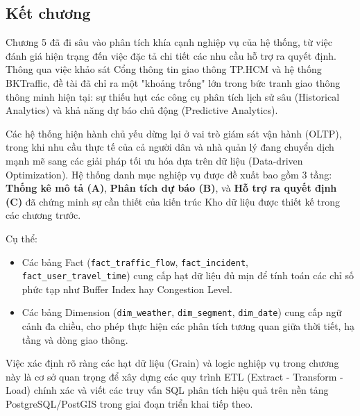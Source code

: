 \subsection{Kết chương}

Chương 5 đã đi sâu vào phân tích khía cạnh nghiệp vụ của hệ thống, từ việc đánh giá hiện trạng đến việc đặc tả chi tiết các nhu cầu hỗ trợ ra quyết định. Thông qua việc khảo sát Cổng thông tin giao thông TP.HCM và hệ thống BKTraffic, đề tài đã chỉ ra một "khoảng trống" lớn trong bức tranh giao thông thông minh hiện tại: sự thiếu hụt các công cụ phân tích lịch sử sâu (Historical Analytics) và khả năng dự báo chủ động (Predictive Analytics).

Các hệ thống hiện hành chủ yếu dừng lại ở vai trò giám sát vận hành (OLTP), trong khi nhu cầu thực tế của cả người dân và nhà quản lý đang chuyển dịch mạnh mẽ sang các giải pháp tối ưu hóa dựa trên dữ liệu (Data-driven Optimization). Hệ thống danh mục nghiệp vụ được đề xuất bao gồm 3 tầng: \textbf{Thống kê mô tả (A)}, \textbf{Phân tích dự báo (B)}, và \textbf{Hỗ trợ ra quyết định (C)} đã chứng minh sự cần thiết của kiến trúc Kho dữ liệu được thiết kế trong các chương trước.

Cụ thể:
\begin{itemize}
    \item Các bảng Fact (\texttt{fact\_traffic\_flow}, \texttt{fact\_incident}, \texttt{fact\_user\_travel\_time}) cung cấp hạt dữ liệu đủ mịn để tính toán các chỉ số phức tạp như Buffer Index hay Congestion Level.
    \item Các bảng Dimension (\texttt{dim\_weather}, \texttt{dim\_segment}, \texttt{dim\_date}) cung cấp ngữ cảnh đa chiều, cho phép thực hiện các phân tích tương quan giữa thời tiết, hạ tầng và dòng giao thông.
\end{itemize}

Việc xác định rõ ràng các hạt dữ liệu (Grain) và logic nghiệp vụ trong chương này là cơ sở quan trọng để xây dựng các quy trình ETL (Extract - Transform - Load) chính xác và viết các truy vấn SQL phân tích hiệu quả trên nền tảng PostgreSQL/PostGIS trong giai đoạn triển khai tiếp theo.
